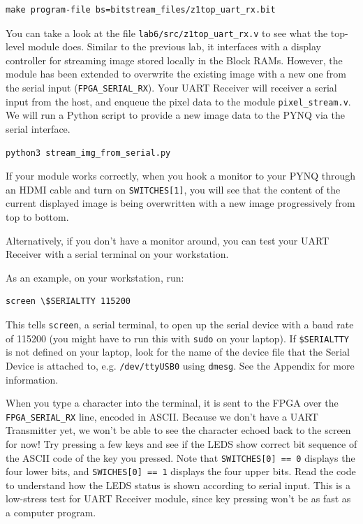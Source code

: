 \documentclass[11pt]{article}
\begin{document}
\begin{verbatim}
make program-file bs=bitstream_files/z1top_uart_rx.bit
\end{verbatim}

You can take a look at the file \verb|lab6/src/z1top_uart_rx.v| to see what the top-level module does. Similar to the previous lab, it interfaces with a display controller for streaming image stored locally in the Block RAMs. However, the module has been extended to overwrite the existing image with a new one from the serial input (\verb|FPGA_SERIAL_RX|). Your UART Receiver will receiver a serial input from the host, and enqueue the pixel data to the module \verb|pixel_stream.v|. We will run a Python script to provide a new image data to the PYNQ via the serial interface.

\begin{verbatim}
python3 stream_img_from_serial.py
\end{verbatim}

If your module works correctly, when you hook a monitor to your PYNQ through an HDMI cable and turn on \verb|SWITCHES[1]|, you will see that the content of the current displayed image is being overwritten with a new image progressively from top to bottom.

Alternatively, if you don't have a monitor around, you can test your UART Receiver with a serial terminal on your workstation.

As an example, on your workstation, run:

\begin{verbatim}
screen \$SERIALTTY 115200
\end{verbatim}

This tells \verb|screen|, a serial terminal, to open up the serial device with a baud rate of 115200 (you might have to run this with \verb|sudo| on your laptop). If \verb|$SERIALTTY| is not defined on your laptop, look for the name of the device file that the Serial Device is attached to, e.g. \verb|/dev/ttyUSB0| using \texttt{dmesg}. See the Appendix for more information.

When you type a character into the terminal, it is sent to the FPGA over the \verb|FPGA_SERIAL_RX| line, encoded in ASCII. Because we don't have a UART Transmitter yet, we won't be able to see the character echoed back to the screen for now! Try pressing a few keys and see if the LEDS show correct bit sequence of the ASCII code of the key you pressed. Note that \verb|SWITCHES[0] == 0| displays the four lower bits, and \verb|SWICHES[0] == 1| displays the four upper bits. Read the code to understand how the LEDS status is shown according to serial input. This is a low-stress test for UART Receiver module, since key pressing won't be as fast as a computer program.
\end{document}
